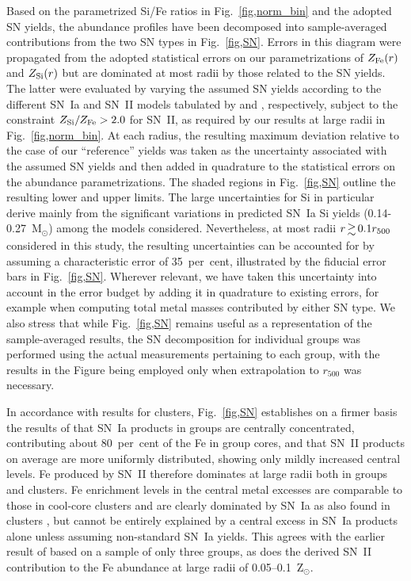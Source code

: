 \documentclass[useAMS,usenatbib]{mn2e}
\begin{document}
Based on the parametrized Si/Fe ratios in Fig.~\ref{fig,norm_bin} and
the adopted SN yields, the abundance profiles have been decomposed
into sample-averaged contributions from the two SN types in
Fig.~\ref{fig,SN}.  Errors in this diagram were propagated from the
adopted statistical errors on our parametrizations of $Z_{\rm Fe}(r)$
and $Z_{\rm Si}(r)$ but are dominated at most radii by those related
to the SN yields. The latter were evaluated by varying the assumed SN
yields according to the different SN~Ia and SN~II models tabulated by
\citet{iwam99} and \citet*{gibs97}, respectively, subject to the
constraint $Z_{\rm Si}/Z_{\rm Fe} > 2.0$ for SN~II, as required by our
results at large radii in Fig.~\ref{fig,norm_bin}. At each radius, the
resulting maximum deviation relative to the case of our ``reference''
yields was taken as the uncertainty associated with the assumed SN
yields and then added in quadrature to the statistical errors on the
abundance parametrizations. The shaded regions in Fig.~\ref{fig,SN}
outline the resulting lower and upper limits. The large uncertainties
for Si in particular derive mainly from the significant variations in
predicted SN~Ia Si yields (0.14-0.27~M$_\odot$) among the models
considered. Nevertheless, at most radii $r\ga 0.1r_{500}$ considered
in this study, the resulting uncertainties can be accounted for by
assuming a characteristic error of 35~per~cent, illustrated by the
fiducial error bars in Fig.~\ref{fig,SN}. Wherever relevant, we have
taken this uncertainty into account in the error budget by adding it
in quadrature to existing errors, for example when computing total
metal masses contributed by either SN type. We also stress that while
Fig.~\ref{fig,SN} remains useful as a representation of the
sample-averaged results, the SN decomposition for individual groups
was performed using the actual measurements pertaining to each group,
with the results in the Figure being employed only when extrapolation
to $r_{500}$ was necessary.

In accordance with results for clusters, Fig.~\ref{fig,SN} establishes
on a firmer basis the results of \citet{fino00} that SN~Ia products in
groups are centrally concentrated, contributing about 80~per~cent of
the Fe in group cores, and that SN~II products on average are more
uniformly distributed, showing only mildly increased central
levels. Fe produced by SN~II therefore dominates at large radii both
in groups and clusters. Fe enrichment levels in the central metal
excesses are comparable to those in cool-core clusters and are clearly
dominated by SN~Ia as also found in clusters \citep{degr04,depl07},
but cannot be entirely explained by a central excess in SN~Ia products
alone unless assuming non-standard SN~Ia yields. This agrees with the
earlier result of \citet{fino99} based on a sample of only three
groups, as does the derived SN~II contribution to the Fe abundance at
large radii of 0.05--0.1~Z$_\odot$.
\end{document}
